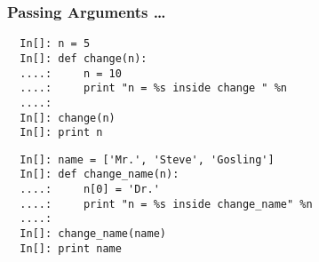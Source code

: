 \begin{frame}[fragile]
  \frametitle{Passing Arguments \ldots}
  \begin{lstlisting}
  In[]: n = 5
  In[]: def change(n):
  ....:     n = 10
  ....:     print "n = %s inside change " %n
  ....:
  In[]: change(n)
  In[]: print n
  \end{lstlisting}
  
  \begin{lstlisting}
  In[]: name = ['Mr.', 'Steve', 'Gosling']
  In[]: def change_name(n):
  ....:     n[0] = 'Dr.'
  ....:     print "n = %s inside change_name" %n
  ....:
  In[]: change_name(name)
  In[]: print name
  \end{lstlisting}
\end{frame}
